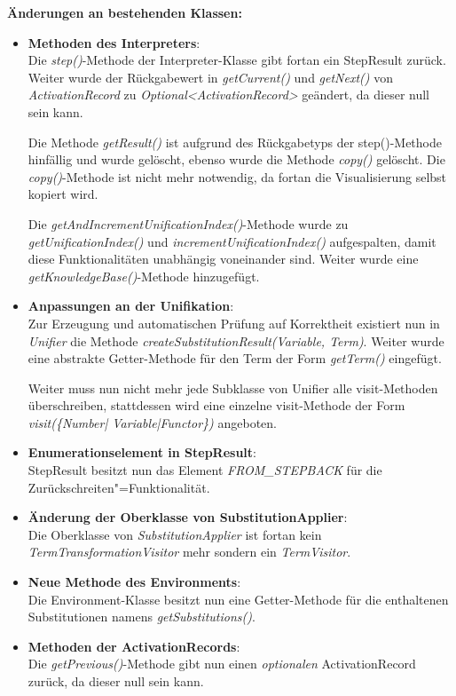 \documentclass[parskip=full,11pt,twoside]{scrartcl}
\begin{document}
\textbf{Änderungen an bestehenden Klassen:}
\begin{itemize}
	\item \textbf{Methoden des Interpreters}:\\
	Die \textit{step()}-Methode der Interpreter-Klasse gibt fortan ein StepResult zurück. Weiter wurde der Rückgabewert in \textit{getCurrent()} und \textit{getNext()} von \textit{ActivationRecord} zu \textit{Optional<ActivationRecord>} geändert, da dieser null sein kann.
	
	Die Methode \textit{getResult()} ist aufgrund des Rückgabetyps der step()-Methode hinfällig und wurde gelöscht, ebenso wurde die Methode \textit{copy()} gelöscht. Die \textit{copy()}-Methode ist nicht mehr notwendig, da fortan die Visualisierung selbst kopiert wird.
	
	Die \textit{getAndIncrementUnificationIndex()}-Methode wurde zu \textit{getUnificationIndex()} und \textit{incrementUnificationIndex()} aufgespalten, damit diese Funktionalitäten unabhängig voneinander sind. Weiter wurde eine \textit{getKnowledgeBase()}-Methode hinzugefügt.
	\item \textbf{Anpassungen an der Unifikation}:\\
	Zur Erzeugung und automatischen Prüfung auf Korrektheit existiert nun in \textit{Unifier} die Methode \textit{createSubstitutionResult(Variable, Term)}. Weiter wurde eine abstrakte Getter-Methode für den Term der Form \textit{getTerm()} eingefügt.
	
	Weiter muss nun nicht mehr jede Subklasse von Unifier alle visit-Methoden überschreiben, stattdessen wird eine einzelne visit-Methode der Form \textit{visit(\{Number| Variable|Functor\})} angeboten.
	\item \textbf{Enumerationselement in StepResult}:\\
	StepResult besitzt nun das Element \textit{FROM\_STEPBACK} für die Zurückschreiten"=Funktionalität.
	\item \textbf{Änderung der Oberklasse von SubstitutionApplier}:\\
	Die Oberklasse von \textit{SubstitutionApplier} ist fortan kein \textit{TermTransformationVisitor} mehr sondern ein \textit{TermVisitor}.
	\item \textbf{Neue Methode des Environments}:\\
	Die Environment-Klasse besitzt nun eine Getter-Methode für die enthaltenen Substitutionen namens \textit{getSubstitutions()}.
	\item \textbf{Methoden der ActivationRecords}:\\
	Die \textit{getPrevious()}-Methode gibt nun einen \textit{optionalen} ActivationRecord zurück, da dieser null sein kann.
	

\end{itemize}
\end{document}

